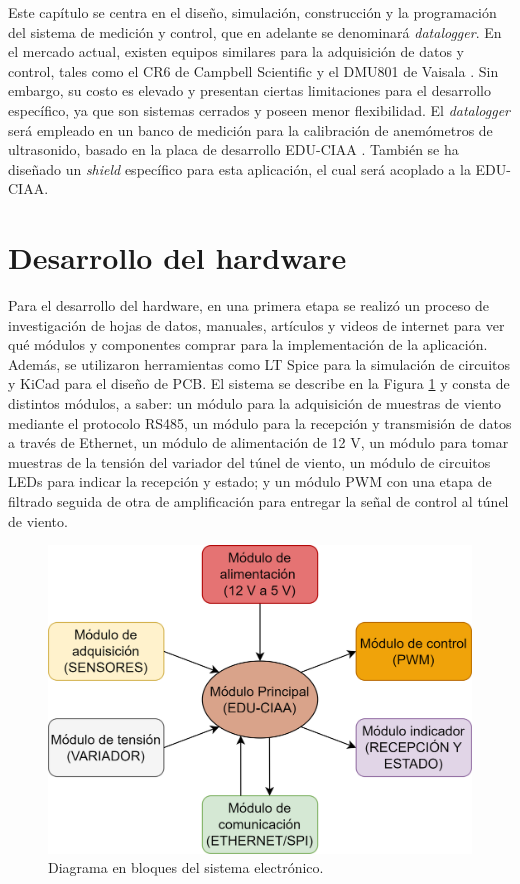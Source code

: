 Este capítulo se centra en el diseño, simulación, construcción y la programación del sistema de medición y control, que en adelante se denominará \textit{datalogger}. En el mercado actual, existen equipos similares para la adquisición de datos y control, tales como el CR6 de Campbell Scientific \cite{cr6manual} y el DMU801 de Vaisala \cite{dmu801manual}. Sin embargo, su costo es elevado y presentan ciertas limitaciones para el desarrollo específico, ya que son sistemas cerrados y poseen menor flexibilidad. El \textit{datalogger} será empleado en un banco de medición para la calibración de anemómetros de ultrasonido, basado en la placa de desarrollo EDU-CIAA \cite{proyectoCIAA}. También se ha diseñado un \textit{shield} específico para esta aplicación, el cual será acoplado a la EDU-CIAA. 


\section{Desarrollo del hardware}\label{sec:desarrolloHardware}
Para el desarrollo del hardware, en una primera etapa se realizó un proceso de investigación de hojas de datos, manuales, artículos y videos de internet para ver qué módulos y componentes comprar para la implementación de la aplicación. Además, se utilizaron herramientas como LT Spice para la simulación de circuitos y KiCad para el diseño de PCB. El sistema se describe en la Figura \ref{fig:esquemaHardware} y consta de distintos módulos, a saber: un módulo para la adquisición de muestras de viento mediante el protocolo RS485, un módulo para la recepción y transmisión de datos a través de Ethernet, un módulo de alimentación de 12 \unit{\volt}, un módulo para tomar muestras de la tensión del variador del túnel de viento, un módulo de circuitos LEDs para indicar la recepción y estado; y un módulo PWM con una etapa de filtrado seguida de otra de amplificación para entregar la señal de control al túnel de viento. 


\begin{figure}[H]
    \centering
    \includegraphics[width=0.7\linewidth]{Figuras/datalogger/esquemaHardware.png}
    \caption{Diagrama en bloques del sistema electrónico.}
    \label{fig:esquemaHardware}
\end{figure}



